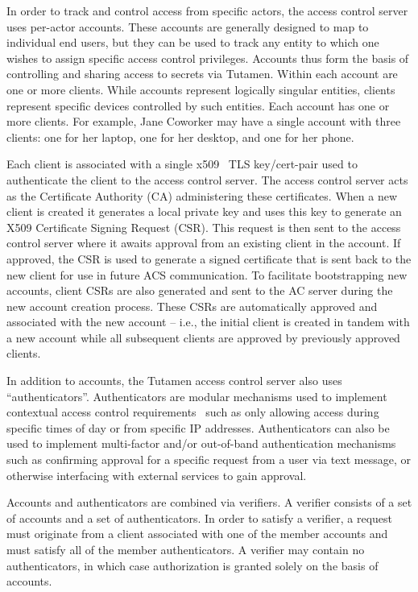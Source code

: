 In order to track and control access from specific actors, the access
control server uses per-actor accounts. These accounts are generally
designed to map to individual end users, but they can be used to track
any entity to which one wishes to assign specific access control
privileges. Accounts thus form the basis of controlling and sharing
access to secrets via Tutamen. Within each account are one or more
clients. While accounts represent logically singular entities, clients
represent specific devices controlled by such entities. Each account
has one or more clients. For example, Jane Coworker may have a single
account with three clients: one for her laptop, one for her desktop,
and one for her phone.

Each client is associated with a single x509~\cite{rfc5280} TLS
key/cert-pair used to authenticate the client to the access control
server. The access control server acts as the Certificate Authority
(CA) administering these certificates. When a new client is created it
generates a local private key and uses this key to generate an X509
Certificate Signing Request (CSR). This request is then sent to the
access control server where it awaits approval from an existing client
in the account. If approved, the CSR is used to generate a signed
certificate that is sent back to the new client for use in future ACS
communication. To facilitate bootstrapping new accounts, client CSRs
are also generated and sent to the AC server during the new account
creation process. These CSRs are automatically approved and associated
with the new account -- i.e., the initial client is created in tandem
with a new account while all subsequent clients are approved by
previously approved clients.

In addition to accounts, the Tutamen access control server also uses
``authenticators''. Authenticators are modular mechanisms used to
implement contextual access control requirements~\cite{hulsebosch2005}
such as only allowing access during specific times of day or from
specific IP addresses. Authenticators can also be used to implement
multi-factor and/or out-of-band authentication mechanisms such as
confirming approval for a specific request from a user via text
message, or otherwise interfacing with external services to gain
approval.

Accounts and authenticators are combined via verifiers. A verifier
consists of a set of accounts and a set of authenticators. In order to
satisfy a verifier, a request must originate from a client associated
with one of the member accounts and must satisfy all of the member
authenticators. A verifier may contain no authenticators, in which
case authorization is granted solely on the basis of accounts.

